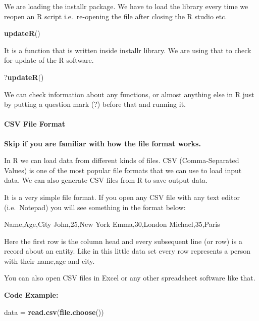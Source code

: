 \documentclass[
]{article}
\newenvironment{Shaded}{\begin{snugshade}}{\end{snugshade}}
\newcommand{\FunctionTok}[1]{\textcolor[rgb]{0.13,0.29,0.53}{\textbf{#1}}}
\newcommand{\NormalTok}[1]{#1}
\newcommand{\OtherTok}[1]{\textcolor[rgb]{0.56,0.35,0.01}{#1}}
\begin{document}
We are loading the installr package. We have to load the library every
time we reopen an R script i.e.~re-opening the file after closing the R
studio etc.

\begin{Shaded}
\begin{Highlighting}[]
\FunctionTok{updateR}\NormalTok{()}
\end{Highlighting}
\end{Shaded}

It is a function that is written inside installr library. We are using
that to check for update of the R software.

\begin{Shaded}
\begin{Highlighting}[]
\NormalTok{?}\FunctionTok{updateR}\NormalTok{()}
\end{Highlighting}
\end{Shaded}

We can check information about any functions, or almost anything else in
R just by putting a question mark (?) before that and running it.

\hypertarget{csv-file-format}{%
\paragraph{CSV File Format}\label{csv-file-format}}

\textbf{Skip if you are familiar with how the file format works.}

In R we can load data from different kinds of files. CSV
(Comma-Separated Values) is one of the most popular file formats that we
can use to load input data. We can also generate CSV files from R to
save output data.

It is a very simple file format. If you open any CSV file with any text
editor (i.e.~Notepad) you will see something in the format below:

Name,Age,City John,25,New York Emma,30,London Michael,35,Paris

Here the first row is the column head and every subsequent line (or row)
is a record about an entity. Like in this little data set every row
represents a person with their name,age and city.

You can also open CSV files in Excel or any other spreadsheet software
like that.

\textbf{Code Example:}

\begin{Shaded}
\begin{Highlighting}[]
\NormalTok{data }\OtherTok{=} \FunctionTok{read.csv}\NormalTok{(}\FunctionTok{file.choose}\NormalTok{())}
\end{Highlighting}
\end{Shaded}
\end{document}
